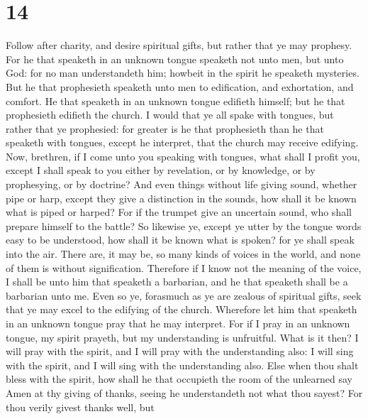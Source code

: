 \hypertarget{section-13}{%
\section{14}\label{section-13}}

 Follow after charity, and desire spiritual gifts, but
rather that ye may prophesy.  For he that speaketh in an
unknown tongue speaketh not unto men, but unto God: for no man
understandeth him; howbeit in the spirit he speaketh mysteries.
 But he that prophesieth speaketh unto men to edification,
and exhortation, and comfort.  He that speaketh in an
unknown tongue edifieth himself; but he that prophesieth edifieth the
church.  I would that ye all spake with tongues, but rather
that ye prophesied: for greater is he that prophesieth than he that
speaketh with tongues, except he interpret, that the church may receive
edifying.  Now, brethren, if I come unto you speaking with
tongues, what shall I profit you, except I shall speak to you either by
revelation, or by knowledge, or by prophesying, or by doctrine?
 And even things without life giving sound, whether pipe or
harp, except they give a distinction in the sounds, how shall it be
known what is piped or harped?  For if the trumpet give an
uncertain sound, who shall prepare himself to the battle? 
So likewise ye, except ye utter by the tongue words easy to be
understood, how shall it be known what is spoken? for ye shall speak
into the air.  There are, it may be, so many kinds of
voices in the world, and none of them is without signification.
 Therefore if I know not the meaning of the voice, I shall
be unto him that speaketh a barbarian, and he that speaketh shall be a
barbarian unto me.  Even so ye, forasmuch as ye are zealous
of spiritual gifts, seek that ye may excel to the edifying of the
church.  Wherefore let him that speaketh in an unknown
tongue pray that he may interpret.  For if I pray in an
unknown tongue, my spirit prayeth, but my understanding is unfruitful.
 What is it then? I will pray with the spirit, and I will
pray with the understanding also: I will sing with the spirit, and I
will sing with the understanding also.  Else when thou
shalt bless with the spirit, how shall he that occupieth the room of the
unlearned say Amen at thy giving of thanks, seeing he understandeth not
what thou sayest?  For thou verily givest thanks well, but
